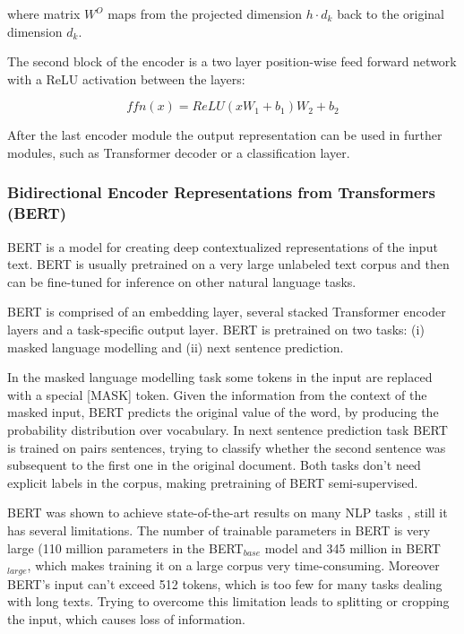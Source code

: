 where matrix $W^O$ maps from the projected dimension $h \cdot d_k$ back to the original dimension $d_k$. 

The second block of the encoder is a two layer position-wise feed forward network with a ReLU activation between the layers:

\begin{equation}
    ffn(x) = ReLU(xW_1+b_1)W_2+b_2
\end{equation}
 
After the last encoder module the output representation can be used in further modules, such as Transformer decoder or a classification layer.

\subsubsection{Bidirectional Encoder Representations from Transformers (BERT)}
\label{bert}

BERT \cite{devlin2018bert} is a model for creating deep contextualized representations of the input text. BERT is usually pretrained on a very large unlabeled text corpus and then can be fine-tuned for inference on other natural language tasks.

BERT is comprised of an embedding layer, several stacked Transformer encoder layers and a task-specific output layer. BERT is pretrained on two tasks: (i) masked language modelling and (ii) next sentence prediction.

In the masked language modelling task some tokens in the input are replaced with a special [MASK] token. Given the information from the context of the masked input, BERT predicts the original value of the word, by producing the probability distribution over vocabulary. In next sentence prediction task BERT is trained on pairs sentences, trying to classify whether the second sentence was subsequent to the first one in the original document. Both tasks don't need explicit labels in the corpus, making pretraining of BERT semi-supervised.

BERT was shown to achieve state-of-the-art results on many NLP tasks \cite{devlin2018bert}, still it has several limitations. The number of trainable parameters in BERT is very large (110 million parameters in the BERT$_{base}$ model and 345 million in BERT$_{large}$, which makes training it on a large corpus very time-consuming. Moreover BERT's input can't exceed 512 tokens, which is too few for many tasks dealing with long texts. Trying to overcome this limitation leads to splitting or cropping the input, which causes loss of information.

